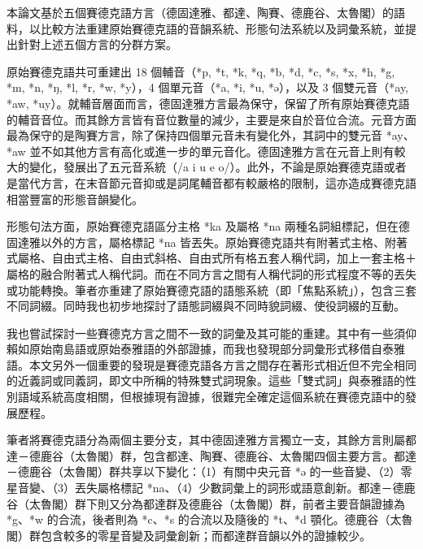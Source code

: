 本論文基於五個賽德克語方言（德固達雅、都達、陶賽、德鹿谷、太魯閣）的語料，以比較方法重建原始賽德克語的音韻系統、形態句法系統以及詞彙系統，並提出針對上述五個方言的分群方案。

原始賽德克語共可重建出 18 個輔音（*p, *t, *k, *q, *b, *d, *c, *s, *x, *h, *g, *m, *n, *ŋ, *l, *r, *w, *y），4 個單元音（*a, *i, *u, *ə），以及 3 個雙元音（*ay, *aw, *uy）。就輔音層面而言，德固達雅方言最為保守，保留了所有原始賽德克語的輔音音位。而其餘方言皆有音位數量的減少，主要是來自於音位合流。元音方面最為保守的是陶賽方言，除了保持四個單元音未有變化外，其詞中的雙元音 *ay、*aw 並不如其他方言有高化或進一步的單元音化。德固達雅方言在元音上則有較大的變化，發展出了五元音系統（/a i u e o/）。此外，不論是原始賽德克語或者是當代方言，在末音節元音抑或是詞尾輔音都有較嚴格的限制，這亦造成賽德克語相當豐富的形態音韻變化。

形態句法方面，原始賽德克語區分主格 *ka 及屬格 *na 兩種名詞組標記，但在德固達雅以外的方言，屬格標記 *na 皆丟失。原始賽德克語共有附著式主格、附著式屬格、自由式主格、自由式斜格、自由式所有格五套人稱代詞，加上一套主格＋屬格的融合附著式人稱代詞。而在不同方言之間有人稱代詞的形式程度不等的丟失或功能轉換。筆者亦重建了原始賽德克語的語態系統（即「焦點系統」），包含三套不同詞綴。同時我也初步地探討了語態詞綴與不同時貌詞綴、使役詞綴的互動。

我也嘗試探討一些賽德克方言之間不一致的詞彙及其可能的重建。其中有一些須仰賴如原始南島語或原始泰雅語的外部證據，而我也發現部分詞彙形式移借自泰雅語。本文另外一個重要的發現是賽德克語各方言之間存在著形式相近但不完全相同的近義詞或同義詞，即文中所稱的特殊雙式詞現象。這些「雙式詞」與泰雅語的性別語域系統高度相關，但根據現有證據，很難完全確定這個系統在賽德克語中的發展歷程。

筆者將賽德克語分為兩個主要分支，其中德固達雅方言獨立一支，其餘方言則屬都達－德鹿谷（太魯閣）群，包含都達、陶賽、德鹿谷、太魯閣四個主要方言。都達－德鹿谷（太魯閣）群共享以下變化：（1）有關中央元音 *ə 的一些音變、（2）零星音變、（3）丟失屬格標記 *na、（4）少數詞彙上的詞形或語意創新。都達－德鹿谷（太魯閣）群下則又分為都達群及德鹿谷（太魯閣）群，前者主要音韻證據為 *g、*w 的合流，後者則為 *c、*s 的合流以及隨後的 *t、*d 顎化。德鹿谷（太魯閣）群包含較多的零星音變及詞彙創新；而都達群音韻以外的證據較少。
